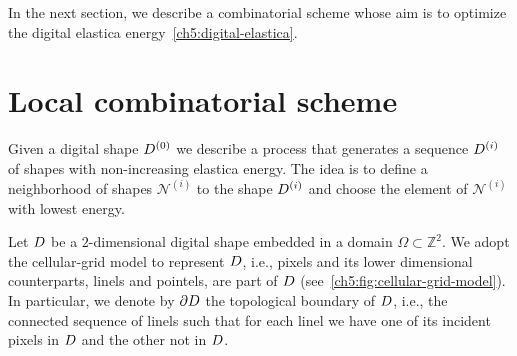  In the next section, we describe a combinatorial scheme whose aim is to optimize the digital elastica energy~\cref{ch5:digital-elastica}.

\section{Local combinatorial scheme}
\label{ch5:sec:local-combinatorial-scheme}

Given a digital shape $D^{(0)}$ we describe a process that generates a
sequence $D^{(i)}$ of shapes with non-increasing elastica energy. The
idea is to define a neighborhood of shapes $\mathcal{N}^{(i)}$ to the
shape $D^{(i)}$ and choose the element of $\mathcal{N}^{(i)}$ with
lowest energy.  

Let $D$ be a $2$-dimensional digital shape embedded in a domain $\Omega \subset \mathbb{Z}^2$. We adopt the cellular-grid model to represent $D$, i.e., pixels and its lower dimensional counterparts, linels and pointels, are part of $D$ (see~\cref{ch5:fig:cellular-grid-model}). In particular, we denote by $\partial D$ the topological boundary of $D$, i.e., the connected sequence of linels such that for each linel we have one of its incident pixels in $D$ and the other not in $D$.


